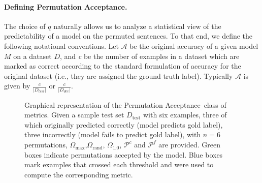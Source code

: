 \documentclass[11pt,a4paper]{article}
\newcommand{\PermAcc}{Permutation Acceptance} %
\begin{document}
\paragraph{Defining \PermAcc.}
The choice of $q$ naturally allows us to analyze a statistical view of the predictability of a model on the permuted sentences. To that end, we define the following notational conventions. Let $\mathcal{A}$ be the original accuracy of a given model $M$ on a dataset $D$, and \textit{c} be the number of examples in a dataset which are marked as correct according to the standard formulation of accuracy for the original dataset (i.e., they are assigned the ground truth label). Typically $\mathcal{A}$ is given by $\frac{c}{|D_{test}|}$ or $\frac{c}{|D_{dev}|}$. %

\begin{figure}[t]
    \centering
    \caption{Graphical representation of the \PermAcc\ class of metrics. Given a sample test set ${D}_{\text{test}}$ with six examples, three of which originally predicted correctly (model predicts gold label), three incorrectly (model fails to predict gold label), with $n=6$ permutations, $\Omega_{\text{max}}$,$\Omega_{\text{rand}}$, $\Omega_{\text{1.0}}$, $\mathcal{P}^c$ and $\mathcal{P}^f$ are provided. Green boxes indicate permutations accepted by the model. Blue boxes mark examples that crossed each threshold and were used to compute the corresponding metric. }
    \label{fig:def_metrics}
\end{figure}
\end{document}

